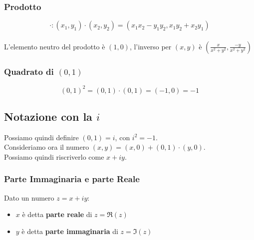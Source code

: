 \documentclass{report}
\begin{document}
        \subsubsection{Prodotto}
            $$\cdot: \left(x_1, y_1\right) \cdot \left(x_2, y_2\right) = \left(x_1x_2 - y_1y_2, x_1y_2 + x_2y_1\right)$$ \\
            L'elemento neutro del prodotto è $\left(1, 0\right)$, l'inverso per $\left(x, y\right)$ è $\left(\frac{x}{x^2+y^2},\frac{-y}{x^2+y^2}\right)$
        \subsubsection{Quadrato di $\left(0, 1\right)$}
            $$\left(0, 1\right)^2 = \left(0, 1\right) \cdot \left(0, 1\right) = \left(-1, 0\right) = -1$$
    \subsection{Notazione con la $i$}
        Possiamo quindi definire $\left(0, 1\right) = i$, con $i^2 = -1$. \\
        Consideriamo ora il numero $\left(x, y\right) = \left(x, 0\right) + \left(0, 1\right) \cdot \left(y, 0\right)$. \\
        Possiamo quindi riscriverlo come $x + iy$.
        \subsubsection{Parte Immaginaria e parte Reale}
            Dato un numero $z = x + iy$:
            \begin{itemize}
                \item $x$ è detta \textbf{parte reale} di $z = \Re\left(z\right)$
                \item $y$ è detta \textbf{parte immaginaria} di $z = \Im\left(z\right)$
            \end{itemize}
\end{document}
